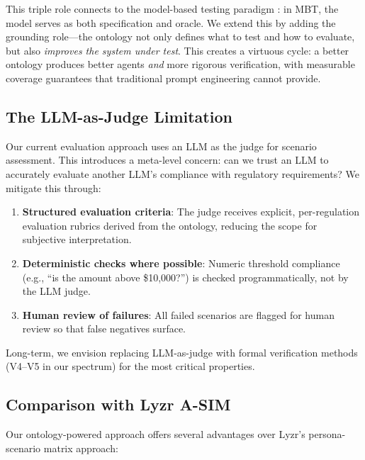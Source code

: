 \documentclass[11pt,a4paper]{article}
\begin{document}
\noindent This triple role connects to the model-based testing
paradigm \citep{utting2012taxonomy}: in MBT, the model serves as
both specification and oracle. We extend this by adding the
grounding role---the ontology not only defines what to test and how
to evaluate, but also \emph{improves the system under test}. This
creates a virtuous cycle: a better ontology produces better agents
\emph{and} more rigorous verification, with measurable coverage
guarantees that traditional prompt engineering cannot provide.

\subsection{The LLM-as-Judge Limitation}

Our current evaluation approach uses an LLM as the judge for
scenario assessment. This introduces a meta-level concern: can
we trust an LLM to accurately evaluate another LLM's compliance
with regulatory requirements? We mitigate this through:

\begin{enumerate}
  \item \textbf{Structured evaluation criteria}: The judge receives
    explicit, per-regulation evaluation rubrics derived from the
    ontology, reducing the scope for subjective interpretation.
  \item \textbf{Deterministic checks where possible}: Numeric
    threshold compliance (e.g., ``is the amount above \$10,000?'')
    is checked programmatically, not by the LLM judge.
  \item \textbf{Human review of failures}: All failed scenarios
    are flagged for human review so that false negatives surface.
\end{enumerate}

Long-term, we envision replacing LLM-as-judge with formal
verification methods (V4--V5 in our spectrum) for the most
critical properties.

\subsection{Comparison with Lyzr A-SIM}

Our ontology-powered approach offers several advantages over
Lyzr's persona-scenario matrix approach:
\end{document}
